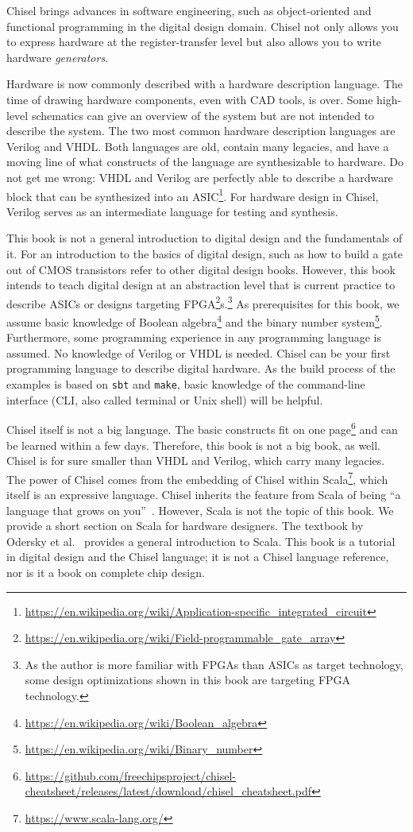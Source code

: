 \documentclass[%
    10pt,
    headinclude, footexclude,
    openright, %
    notitlepage,
    cleardoubleempty,
    headsepline,
    pointlessnumbers,
    bibtotoc, idxtotoc,
    ]{scrbook}
\newcommand{\code}[1]{{\lstinline[basicstyle=\small\ttfamily]{#1}}}
\newcommand{\myref}[2]{\href{#1}{#2}}
\renewcommand{\myref}[2]{{#2}{\footnote{\url{#1}}}}
\begin{document}
Chisel brings advances in software engineering, such as object-oriented
and functional programming in the digital design domain.
Chisel not only allows you to express hardware at the register-transfer level
but also allows you to write hardware \emph{generators}.

Hardware is now commonly described with a hardware description language.
The time of drawing hardware components, even with CAD tools, is
over. Some high-level schematics can give an overview of the system but are
not intended to describe the system.
The two most common hardware description languages are Verilog and VHDL.
Both languages are old, contain many legacies, and have a moving line of what
constructs of the language are synthesizable to hardware.
Do not get me wrong: VHDL and Verilog are perfectly able to describe a hardware
block that can be synthesized into an
\myref{https://en.wikipedia.org/wiki/Application-specific_integrated_circuit}{ASIC}.
For hardware design in Chisel, Verilog serves as an intermediate language
for testing and synthesis.

This book is not a general introduction to digital design and the fundamentals of it.
For an introduction to the basics of digital design, such as how to build a gate out of
CMOS transistors refer to other digital design books.
However, this book intends to teach digital design at an abstraction level that is
current practice to describe ASICs or designs targeting
\myref{https://en.wikipedia.org/wiki/Field-programmable_gate_array}{FPGA}s.\footnote{As the author is more familiar with FPGAs
than ASICs as target technology, some design optimizations shown in this book are
targeting FPGA technology.}
As prerequisites for this book, we assume basic knowledge of
\myref{https://en.wikipedia.org/wiki/Boolean_algebra}{Boolean algebra} and the
\myref{https://en.wikipedia.org/wiki/Binary_number}{binary number system}.
Furthermore, some programming experience in any programming language
is assumed. No knowledge of Verilog or VHDL is needed.
Chisel can be your first programming language to describe digital hardware.
As the build process of the examples is based on \code{sbt} and \code{make},
basic knowledge of the command-line interface (CLI, also called terminal or
Unix shell) will be helpful.

Chisel itself is not a big language. The basic constructs fit on
\myref{https://github.com/freechipsproject/chisel-cheatsheet/releases/latest/download/chisel_cheatsheet.pdf}{one page}
and can be learned within a few days.
Therefore, this book is not a big book, as well.
Chisel is for sure smaller than VHDL and Verilog, which carry many legacies.
The power of Chisel comes from the embedding of Chisel within
\myref{https://www.scala-lang.org/}{Scala}, which itself is an expressive language.
Chisel inherits the feature from Scala of being ``a language that grows on you''~\cite{Scala}.
However, Scala is not the topic of this book.
We provide a short section on Scala for hardware designers.
The textbook by Odersky et al.~\cite{Scala} provides a general introduction
to Scala.
This book is a tutorial in digital design and the Chisel language; it is not
a Chisel language reference, nor is it a book on complete chip design.
\end{document}
